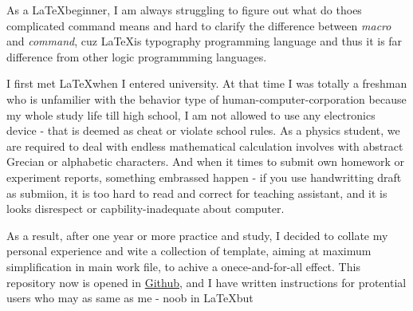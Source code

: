     As a \LaTeX beginner, I am always struggling  to figure out what do thoes complicated command means and hard to clarify the difference between \emph{macro} and \emph{command}, cuz \LaTeX is typography programming language and thus it is far difference from other logic programmming languages. 

    I first met \LaTeX when I entered university. At that time I was totally a freshman who is unfamilier with the behavior type of human-computer-corporation because my whole study life till high school, I am not allowed to use any electronics device - that is deemed as cheat or violate school rules. As a physics student, we are required to deal with endless mathematical calculation involves with abstract Grecian or alphabetic characters. And when it times to submit own homework or experiment reports, something embrassed happen - if you use handwritting draft as submiion, it is too hard to read and correct for teaching assistant, and it is looks disrespect or capbility-inadequate about computer. 
    
    As a result, after one year or more practice and study, I decided to collate my personal experience and wite a collection of template, aiming at maximum simplification in main work file, to achive a onece-and-for-all effect. This repository now is opened in \href{https://github.com/SweetPastry/spTemplate}{Github}, and I have written instructions for protential users who may as same as me - noob in \LaTeX but 
